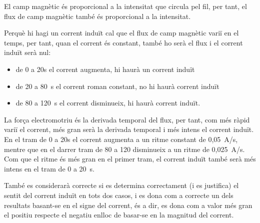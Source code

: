 \begin{solapartat}
 El camp magnètic és proporcional a la intensitat que circula pel fil, per tant, el flux de camp magnètic també és proporcional a la intensitat.

Perquè hi hagi un corrent induït cal que el flux de camp magnètic variï en el temps, per tant, quan el corrent és constant, també ho serà el flux i el corrent induït serà nul:
\begin{itemize}
  \item de 0 a 20s el corrent augmenta, hi haurà un corrent induït
  \item de 20 a 80~s el corrent roman constant, no hi haurà corrent induït
  \item de 80 a 120~s el corrent disminueix, hi haurà corrent induït.
\end{itemize}

 La força electromotriu és la derivada temporal del flux, per tant, com més ràpid variï el corrent, més gran serà la derivada temporal i més intens el corrent induït. En el tram de 0 a 20s el corrent augmenta a un ritme constant de 0,05~A/s, mentre que en el darrer tram de 80 a 120 disminueix a un ritme de 0,025~A/s. Com que el ritme és més gran en el primer tram, el corrent induït també serà més intens en el tram de 0 a 20~s.

També es considerarà correcte si es determina correctament (i es justifica) el sentit del corrent induït en tots dos casos, i es dona com a correcte un dels resultats basant-se en el signe del corrent, és a dir, es dona com a valor més gran el positiu respecte el negatiu enlloc de basar-se en la magnitud del corrent.
\end{solapartat}
